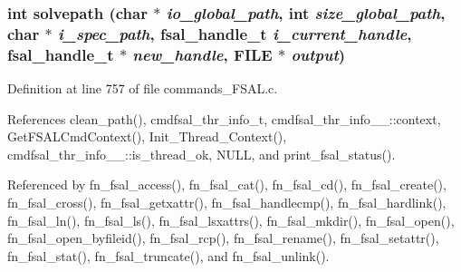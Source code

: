 \subsubsection{\setlength{\rightskip}{0pt plus 5cm}int solvepath (char $\ast$ {\em io\_\-global\_\-path}, int {\em size\_\-global\_\-path}, char $\ast$ {\em i\_\-spec\_\-path}, fsal\_\-handle\_\-t {\em i\_\-current\_\-handle}, fsal\_\-handle\_\-t $\ast$ {\em new\_\-handle}, FILE $\ast$ {\em output})}\label{commands__FSAL_8c_a19}




Definition at line 757 of file commands\_\-FSAL.c.

References clean\_\-path(), cmdfsal\_\-thr\_\-info\_\-t, cmdfsal\_\-thr\_\-info\_\-\_\-::context, Get\-FSALCmd\-Context(), Init\_\-Thread\_\-Context(), cmdfsal\_\-thr\_\-info\_\-\_\-::is\_\-thread\_\-ok, NULL, and print\_\-fsal\_\-status().

Referenced by fn\_\-fsal\_\-access(), fn\_\-fsal\_\-cat(), fn\_\-fsal\_\-cd(), fn\_\-fsal\_\-create(), fn\_\-fsal\_\-cross(), fn\_\-fsal\_\-getxattr(), fn\_\-fsal\_\-handlecmp(), fn\_\-fsal\_\-hardlink(), fn\_\-fsal\_\-ln(), fn\_\-fsal\_\-ls(), fn\_\-fsal\_\-lsxattrs(), fn\_\-fsal\_\-mkdir(), fn\_\-fsal\_\-open(), fn\_\-fsal\_\-open\_\-byfileid(), fn\_\-fsal\_\-rcp(), fn\_\-fsal\_\-rename(), fn\_\-fsal\_\-setattr(), fn\_\-fsal\_\-stat(), fn\_\-fsal\_\-truncate(), and fn\_\-fsal\_\-unlink().